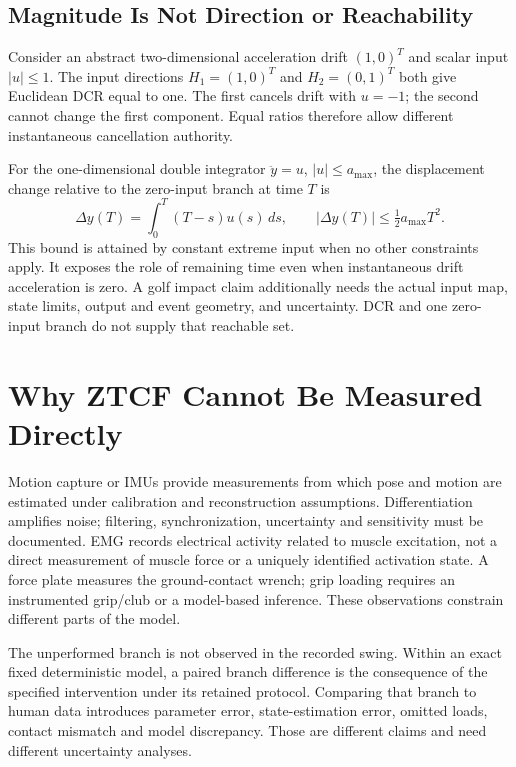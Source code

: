 \subsection{Magnitude Is Not Direction or Reachability}
\label{sec:swing_ballistic_commitment}

Consider an abstract two-dimensional acceleration drift $(1,0)^T$ and scalar input $|u|\le1$. The input directions $H_1=(1,0)^T$ and $H_2=(0,1)^T$ both give Euclidean DCR equal to one. The first cancels drift with $u=-1$; the second cannot change the first component. Equal ratios therefore allow different instantaneous cancellation authority.

For the one-dimensional double integrator $\ddot y=u$, $|u|\le a_{\max}$, the displacement change relative to the zero-input branch at time $T$ is
\begin{equation}
\Delta y(T)=\int_0^T(T-s)u(s)\,ds,\qquad
|\Delta y(T)|\le\tfrac12a_{\max}T^2.
\end{equation}
This bound is attained by constant extreme input when no other constraints apply. It exposes the role of remaining time even when instantaneous drift acceleration is zero. A golf impact claim additionally needs the actual input map, state limits, output and event geometry, and uncertainty. DCR and one zero-input branch do not supply that reachable set.

\section{Why ZTCF Cannot Be Measured Directly}
\label{sec:ztcf_model_dependent}

Motion capture or IMUs provide measurements from which pose and motion are estimated under calibration and reconstruction assumptions. Differentiation amplifies noise; filtering, synchronization, uncertainty and sensitivity must be documented. EMG records electrical activity related to muscle excitation, not a direct measurement of muscle force or a uniquely identified activation state. A force plate measures the ground-contact wrench; grip loading requires an instrumented grip/club or a model-based inference. These observations constrain different parts of the model.

The unperformed branch is not observed in the recorded swing. Within an exact fixed deterministic model, a paired branch difference is the consequence of the specified intervention under its retained protocol. Comparing that branch to human data introduces parameter error, state-estimation error, omitted loads, contact mismatch and model discrepancy. Those are different claims and need different uncertainty analyses.

